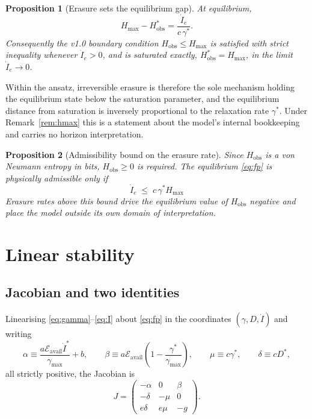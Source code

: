 \documentclass[11pt,a4paper]{article}
\newtheorem{proposition}{Proposition}
\theoremstyle{definition}
\begin{document}
\begin{proposition}[Erasure sets the equilibrium gap]
\label{prop:gap}
At equilibrium,
\begin{equation}
H_{\max}-H^{*}_{\text{obs}}=\frac{\dot I_e}{c\,\gamma^{*}} .
\end{equation}
Consequently the v1.0 boundary condition $H_{\text{obs}}\le H_{\max}$ is
satisfied with strict inequality whenever $\dot I_e>0$, and is saturated
exactly, $H^{*}_{\text{obs}}=H_{\max}$, in the limit $\dot I_e\to 0$.
\end{proposition}

Within the ansatz, irreversible erasure is therefore the sole mechanism holding
the equilibrium state below the saturation parameter, and the equilibrium
distance from saturation is inversely proportional to the relaxation rate
$\gamma^{*}$. Under Remark~\ref{rem:hmax} this is a statement about the model's
internal bookkeeping and carries no horizon interpretation.

\begin{proposition}[Admissibility bound on the erasure rate]
\label{prop:admiss}
Since $H_{\text{obs}}$ is a von Neumann entropy in bits, $H_{\text{obs}}\ge 0$
is required. The equilibrium \eqref{eq:fp} is physically admissible only if
\begin{equation}
\boxed{\;\dot I_e\;\le\;c\,\gamma^{*}H_{\max}\;}
\end{equation}
Erasure rates above this bound drive the equilibrium value of
$H_{\text{obs}}$ negative and place the model outside its own domain of
interpretation.
\end{proposition}

\section{Linear stability}

\subsection{Jacobian and two identities}

Linearising \eqref{eq:gamma}--\eqref{eq:I} about \eqref{eq:fp} in the
coordinates $(\gamma,D,\dot I)$ and writing
\begin{equation}
\alpha\equiv\frac{a\mathcal{E}_{\text{avail}}\dot I^{*}}{\gamma_{\max}}+b,
\qquad
\beta\equiv a\mathcal{E}_{\text{avail}}\!\left(1-\frac{\gamma^{*}}{\gamma_{\max}}\right),
\qquad
\mu\equiv c\gamma^{*},
\qquad
\delta\equiv cD^{*},
\end{equation}
all strictly positive, the Jacobian is
\begin{equation}
J=\begin{pmatrix}
-\alpha & 0 & \beta\\
-\delta & -\mu & 0\\
e\delta & e\mu & -g
\end{pmatrix}.
\label{eq:jac}
\end{equation}
\end{document}
